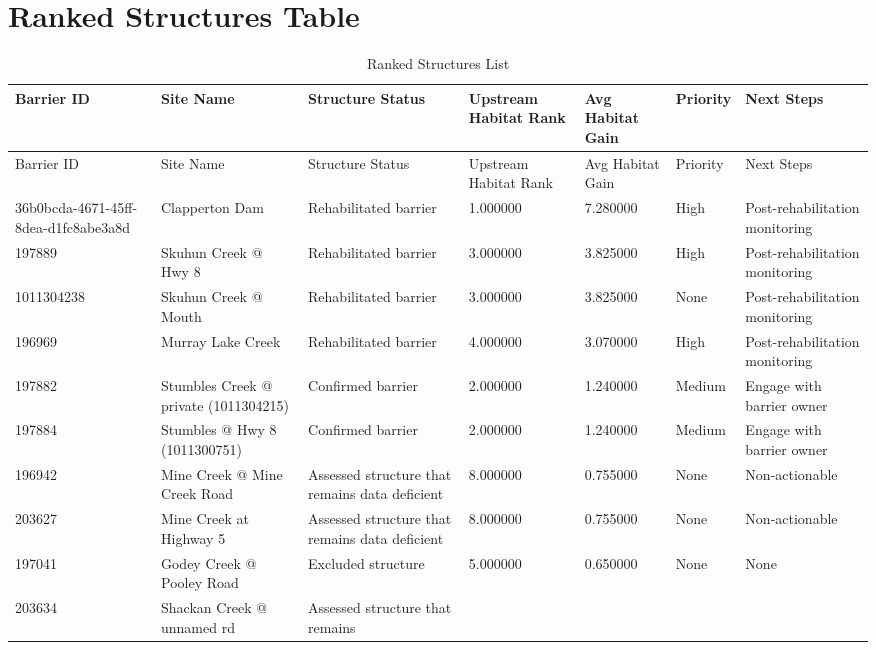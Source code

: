 \documentclass[
  letterpaper,
  DIV=11,
  numbers=noendperiod]{scrreprt}
\begin{document}
\hypertarget{ranked-structures-table}{%
\section*{Ranked Structures Table}\label{ranked-structures-table}}


\hypertarget{tbl-ranked}{}
\begin{longtable}[]{@{}lllllll@{}}
\caption{\label{tbl-ranked}Ranked Structures
List}\label{T_57e8f}\tabularnewline
\toprule\noalign{}
Barrier ID & Site Name & Structure Status & Upstream Habitat Rank & Avg
Habitat Gain & Priority & Next Steps \\
\midrule\noalign{}
\endfirsthead
\toprule\noalign{}
Barrier ID & Site Name & Structure Status & Upstream Habitat Rank & Avg
Habitat Gain & Priority & Next Steps \\
\midrule\noalign{}
\endhead
\bottomrule\noalign{}
\endlastfoot
36b0bcda-4671-45ff-8dea-d1fc8abe3a8d & Clapperton Dam & Rehabilitated
barrier & 1.000000 & 7.280000 & High & Post-rehabilitation monitoring \\
197889 & Skuhun Creek @ Hwy 8 & Rehabilitated barrier & 3.000000 &
3.825000 & High & Post-rehabilitation monitoring \\
1011304238 & Skuhun Creek @ Mouth & Rehabilitated barrier & 3.000000 &
3.825000 & None & Post-rehabilitation monitoring \\
196969 & Murray Lake Creek & Rehabilitated barrier & 4.000000 & 3.070000
& High & Post-rehabilitation monitoring \\
197882 & Stumbles Creek @ private (1011304215) & Confirmed barrier &
2.000000 & 1.240000 & Medium & Engage with barrier owner \\
197884 & Stumbles @ Hwy 8 (1011300751) & Confirmed barrier & 2.000000 &
1.240000 & Medium & Engage with barrier owner \\
196942 & Mine Creek @ Mine Creek Road & Assessed structure that remains
data deficient & 8.000000 & 0.755000 & None & Non-actionable \\
203627 & Mine Creek at Highway 5 & Assessed structure that remains data
deficient & 8.000000 & 0.755000 & None & Non-actionable \\
197041 & Godey Creek @ Pooley Road & Excluded structure & 5.000000 &
0.650000 & None & None \\
203634 & Shackan Creek @ unnamed rd & Assessed structure that remains

\end{longtable}
\end{document}
